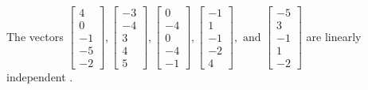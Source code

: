 \begin{exercise}
\begin{exerciseStatement}
  \end{exerciseStatement}
  \begin{exerciseAnswer}
   The vectors \(\left[\begin{array}{r}
4 \\
0 \\
-1 \\
-5 \\
-2
\end{array}\right] , \left[\begin{array}{r}
-3 \\
-4 \\
3 \\
4 \\
5
\end{array}\right] , \left[\begin{array}{r}
0 \\
-4 \\
0 \\
-4 \\
-1
\end{array}\right] , \left[\begin{array}{r}
-1 \\
1 \\
-1 \\
-2 \\
4
\end{array}\right] , \text{ and } \left[\begin{array}{r}
-5 \\
3 \\
-1 \\
1 \\
-2
\end{array}\right]\) are 
  	 linearly independent  .
  


  \end{exerciseAnswer}
\end{exercise}